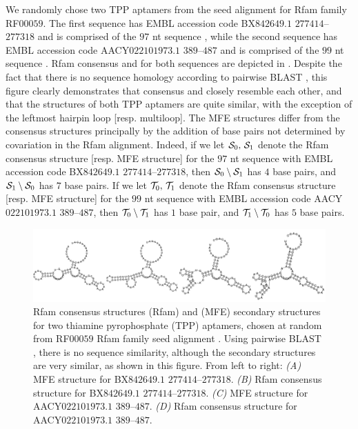 We randomly chose two TPP \rb
aptamers from the seed alignment for
Rfam family RF$00059$. The first sequence has EMBL accession code
BX$842649.1$ $277414$--$277318$ and is comprised of the $97$ nt sequence
, while the second sequence
has EMBL accession code AACY$022101973.1$ $389$--$487$ and is comprised of the $99$
nt sequence
.
Rfam consensus and \mfess for both sequences are
depicted in .
Despite the fact that there is no sequence homology according to
pairwise BLAST \citep{blast}, this figure clearly demonstrates that
consensus and
\mfess closely resemble each other, and that the
structures of both TPP \rb aptamers are quite similar, with the
exception of the leftmost hairpin loop [resp. multiloop].
The MFE structures differ
from the consensus structures principally by the addition of base pairs not
determined by covariation in the Rfam alignment.
Indeed, if we let $\mathcal S_0,\,\mathcal S_1$
denote the Rfam consensus structure [resp. MFE structure] for the $97$ nt
sequence with EMBL accession code BX$842649.1$ $277414$--$277318$, then
$\mathcal S_0 \setminus \mathcal S_1$ has $4$ base pairs, and $\mathcal S_1 \setminus \mathcal S_0$
 has $7$
base pairs. If we let $\mathcal T_0,\,\mathcal T_1$
denote the Rfam consensus structure [resp. MFE structure] for the $99$ nt
sequence with EMBL accession code
AACY$022101973.1$ $389$--$487$, then
$\mathcal T_0 \setminus \mathcal T_1$ has $1$ base pair, and $\mathcal T_1 \setminus \mathcal T_0$ has $5$
base pairs.

\begin{figure}[!ht]
\centering
\includegraphics[width=.9\textwidth]{Figures/FFTbor/tppConsensusAndMfe.pdf}
\caption[Rfam consensus structures (Rfam) and \mfe (MFE)
secondary structures for two thiamine pyrophosphate (TPP) \rb aptamers]{Rfam consensus structures (Rfam) and \mfe (MFE)
secondary structures for two thiamine pyrophosphate (TPP) \rb aptamers,
chosen at random from RF$00059$ Rfam family seed alignment
\citep{Gardner.nar11}. Using pairwise BLAST \citep{blast}, there is no
sequence similarity, although the secondary structures are very similar,
as shown in this figure. From left to right:
{\em (A)} MFE structure for BX$842649.1$ $277414$--$277318$.
{\em (B)} Rfam consensus structure for BX$842649.1$ $277414$--$277318$.
{\em (C)} MFE structure for AACY$022101973.1$ $389$--$487$.
{\em (D)} Rfam consensus structure for AACY$022101973.1$ $389$--$487$.
}
\label{fig:fftbor:tppConsensusAndMfe}
\end{figure}

